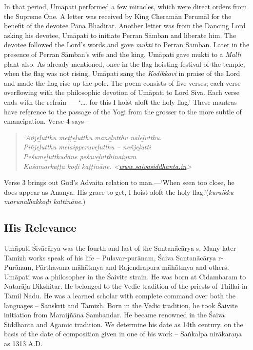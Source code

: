 In that period, Umāpati performed a few miracles, which were direct orders from the Supreme One. A letter was received by King Cheramān Perumāl for the benefit of the devotee Pāna Bhadirar. Another letter was from the Dancing Lord asking his devotee, Umāpati to initiate Perran Sāmban and liberate him. The devotee followed the Lord’s words and gave \textit{mukti }to Perran Sāmban. Later in the presence of Perran Sāmban’s wife and the king, Umāpati gave mukti to a \textit{Malli} plant also. As already mentioned, once in the flag-hoisting festival of the temple, when the flag was not rising, Umāpati sang the \textit{Kodikkavi} in praise of the Lord and made the flag rise up the pole. The poem consists of five verses; each verse overflowing with the philosophic devotion of Umāpati to Lord Siva. Each verse ends with the refrain -----‘…. for this I hoist aloft the holy flag.’ These mantras have reference to the passage of the Yogi from the grosser to the more subtle of emancipation. Verse 4 says –

\begin{quote}
\textit{‘Añjeḻutthu meṭṭeḻutthu māneḻutthu nāleḻutthu. }\\\textit{Piñjeḻutthu melaipperuveḻutthu – neñjeḻutti}\\\textit{Peśumeḻutthudāne peśāveḻutthinaiyum}\\\textit{Kuśamarkaṭṭa koḍi kaṭṭināne. \textless \url{www.saivasiddhanta.in}\textgreater  }
\end{quote}

Verse 3 brings out God’s Advaita relation to man.—‘When seen too close, he does appear as Ananya. His grace to get, I hoist aloft the holy flag.’(\textit{kuraikku marunalhakkoḍi kattināne}.)


\subsection{His Relevance}

Umāpati Śivācārya was the fourth and last of the Santanācārya-s. Many later Tamizh works speak of his life – Pulavar-purānam, Śaiva Santanācārya r-Purānam, Pārthavana māhātmya and Rajendrapura māhātmya and others. Umāpati was a philosopher in the Śaivite strain. He was born at Cidambaram to Natarāja Dikshitar. He belonged to the Vedic tradition of the priests of Thillai in Tamil Nadu. He was a learned scholar with complete command over both the languages – Sanskrit and Tamizh. Born in the Vedic tradition, he took Śaivite initiation from Maraijñāna Sambandar. He became renowned in the Śaiva Siddhānta and Agamic tradition. We determine his date as 14th century, on the basis of the date of composition given in one of his work – Saṅkalpa nirākaraṇa as 1313 A.D.

